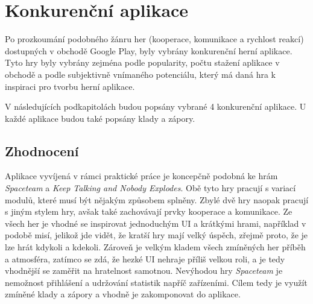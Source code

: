 \chapter{Konkurenční aplikace}
\label{chap:competitive-apps}

Po prozkoumání podobného žánru her
(kooperace, komunikace a rychlost reakcí)
dostupných v obchodě Google Play,
byly vybrány konkurenční herní aplikace.
Tyto hry byly vybrány zejména podle popularity,
počtu stažení aplikace v obchodě
a podle subjektivně vnímaného potenciálu,
který má daná hra k inspiraci pro tvorbu herní aplikace.

V následujících podkapitolách budou popsány vybrané 4 konkurenční aplikace.
U každé aplikace budou také popsány klady a zápory.






\section{Zhodnocení}

Aplikace vyvíjená v rámci praktické práce je koncepčně podobná ke hrám
\emph{Spaceteam} a \emph{Keep Talking and Nobody Explodes}.
Obě tyto hry pracují s variací modulů,
které musí být nějakým způsobem splněny.
Zbylé dvě hry naopak pracují s jiným stylem hry,
avšak také zachovávají prvky kooperace a komunikace.
Ze všech her je vhodné se inspirovat jednoduchým UI a krátkými hrami,
například v podobě misí,
jelikož jde vidět,
že kratší hry mají velký úspěch,
zřejmě proto,
že je lze hrát kdykoli a kdekoli.
Zároveň je velkým kladem všech zmíněných her příběh a atmosféra,
zatímco se zdá,
že hezké UI nehraje příliš velkou roli,
a je tedy vhodnější se zaměřit na hratelnost samotnou.
Nevýhodou hry \emph{Spaceteam} je nemožnost přihlášení a udržování statistik
napříč zařízeními.
Cílem tedy je využít zmíněné klady a zápory a vhodně je zakomponovat do
aplikace.
